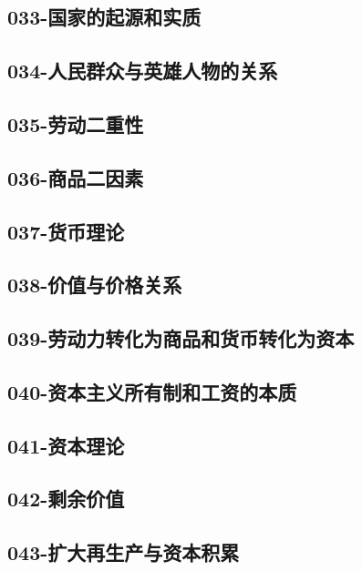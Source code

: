 \subsection{033-国家的起源和实质}

\subsection{034-人民群众与英雄人物的关系}

\subsection{035-劳动二重性}

\subsection{036-商品二因素}

\subsection{037-货币理论}

\subsection{038-价值与价格关系}

\subsection{039-劳动力转化为商品和货币转化为资本}

\subsection{040-资本主义所有制和工资的本质}

\subsection{041-资本理论}

\subsection{042-剩余价值}

\subsection{043-扩大再生产与资本积累}

